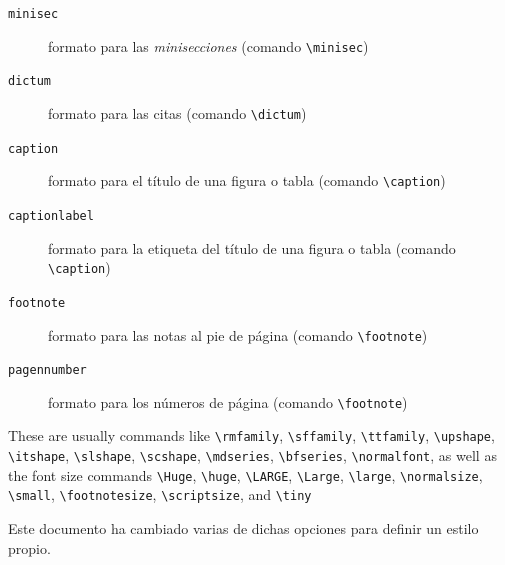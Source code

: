 \documentclass{scrartcl}
\begin{document}
\begin{description}
  \item[\texttt{minisec}] formato para las \emph{minisecciones} (comando \verb+\minisec+)
  \item[\texttt{dictum}] formato para las citas (comando \verb+\dictum+)
  \item[\texttt{caption}] formato para el título de una figura o tabla (comando \verb+\caption+) 
  \item[\texttt{captionlabel}] formato para la etiqueta del título de una figura o tabla (comando \verb+\caption+) 
  \item[\texttt{footnote}] formato para las notas al pie de página (comando \verb+\footnote+) 
  \item[\texttt{pagennumber}] formato para los números de página (comando \verb+\footnote+) 
\end{description}

These are usually commands like \verb+\rmfamily+, \verb+\sffamily+, \verb+\ttfamily+, \verb+\upshape+, \verb+\itshape+, \verb+\slshape+, \verb+\scshape+, \verb+\mdseries+, \verb+\bfseries+, \verb+\normalfont+, as well as the font size commands \verb+\Huge+, \verb+\huge+, \verb+\LARGE+, \verb+\Large+, \verb+\large+, \verb+\normalsize+, \verb+\small+, \verb+\footnotesize+, \verb+\scriptsize+, and \verb+\tiny+

Este documento ha cambiado varias de dichas opciones para definir un estilo propio.
\end{document}

